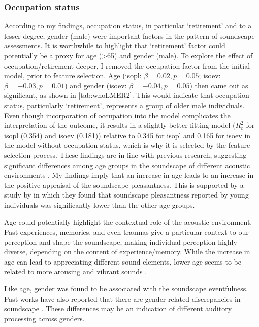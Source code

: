 \subsubsection*{Occupation status}

According to my findings, occupation status, in particular `retirement' and to a lesser degree, gender (male) were important factors in the pattern of soundscape assessments. It is worthwhile to highlight that `retirement' factor could potentially be a proxy for age (>65) and gender (male). To explore the effect of occupation/retirement deeper, I removed the occupation factor from the initial model, prior to feature selection. Age (\gls{isopl}: $\beta=0.02, p=0.05$; \gls{isoev}: $\beta=-0.03, p=0.01$) and gender (\gls{isoev}: $\beta=-0.04, p=0.05$) then came out as significant, as shown in \cref{tab:whoLMER2}. This would indicate that occupation status, particularly `retirement', represents a group of older male individuals. Even though incorporation of occupation into the model complicates the interpretation of the outcome, it results in a slightly better fitting model ($R^2_c$ for \gls{isopl} (0.354) and \gls{isoev} (0.181)) relative to 0.345 for \gls{isopl} and 0.165 for \gls{isoev} in the model without occupation status, which is why it is selected by the feature selection process. These findings are in line with previous research, suggesting significant differences among age groups in the soundscape of different acoustic environments \citep{Ren2016Soundscape,Yang2005Acoustic}. My findings imply that an increase in age leads to an increase in the positive appraisal of the soundscape pleasantness. This is supported by a study by \citet{Aydin2016Assessment} in which they found that soundscape pleasantness reported by young individuals was significantly lower than the other age groups.

Age could potentially highlight the contextual role of the acoustic environment. Past experiences, memories, and even traumas give a particular context to our perception and shape the soundscape, making individual perception highly diverse, depending on the content of experience/memory. While the increase in age can lead to appreciating different sound elements, lower age seems to be related to more arousing and vibrant sounds \citep{Yang2005Acoustic}.

Like age, gender was found to be associated with the soundscape eventfulness. Past works have also reported that there are gender-related discrepancies in soundscape \citep{Croome1977Noise,Yang2005Acoustic}. These differences may be an indication of different auditory processing across genders.

